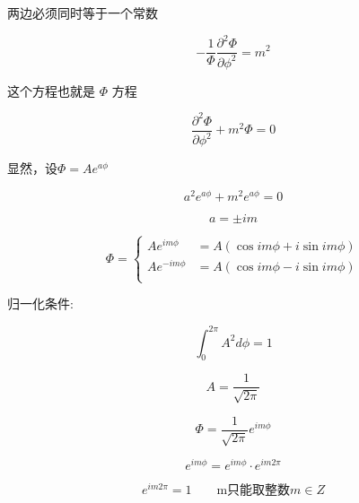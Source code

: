 \documentclass[a4paper]{ctexrep}
\begin{document}
    两边必须同时等于一个常数 

    \[
         - \frac{1}{\Phi} \frac{\partial ^2 \Phi}{\partial \phi ^2} = m^2
    \]

    这个方程也就是 $\Phi$ 方程

    \[
        \frac{\partial ^2 \Phi}{\partial \phi ^2} + m^2 \Phi  = 0
    \]

    显然，设$\Phi = A e^{a \phi}$ 

    \[
        a^2 e^{a \phi} + m^2 e^{a \phi} = 0
    \]

    \[
        a = \pm im  
    \]

    \[
        \Phi = \begin{cases}
            Ae^{im\phi} & = A( \cos im\phi + i \sin im \phi)  \\
            Ae^{-im\phi} & =  A( \cos im\phi - i \sin im \phi) \\
        \end{cases}  
    \]

    归一化条件:


    \[
        \int_0^{2\pi} A^2 d\phi = 1 
    \] 

    \[
        A = \frac{1}{\sqrt{2\pi}}  
    \]
    
    \[
        \Phi = \frac{1}{\sqrt{2\pi}} e ^{im\phi}  
    \]

    \[
        e^{im\phi} = e^{im\phi} \cdot e^{im2\pi}  
    \]
    
    \[
        e^{im 2\pi} = 1  \qquad \mbox{m只能取整数} m \in Z
    \]

    
\end{document}

